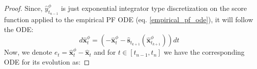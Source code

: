 \documentclass[11pt]{article}
\newcommand{\xh}[1]{\textcolor[HTML]{66CCFF}{#1}}
\def\rvx{{\mathbf{x}}}
\def\rvy{{\mathbf{y}}}
\def\vs{{\bm{s}}}
\def\vy{{\bm{y}}}
\begin{document}
\begin{proof}
Since, $\hat{y}^\phi_{t_{n-1}}$ is just exponential integrator type discretization on the score function applied to the empirical PF ODE (eq. \ref{empirical_pf_ode}), it will follow the ODE:
\[
    d \hat{\rvx}^\phi_t = \left(-\hat{\rvx}^\phi_t - \hat{\vs}_{t_{k+1}}(\hat{\rvx}^\phi_{t_{k+1}})\right)dt
    \]
Now, we denote $e_t = \hat{\rvx}_t^\phi - \hat{\rvx}_t$ and for $t\in [t_{n-1},t_{n}]$ we have the corresponding ODE for its evolution as:


\end{proof}
\end{document}
